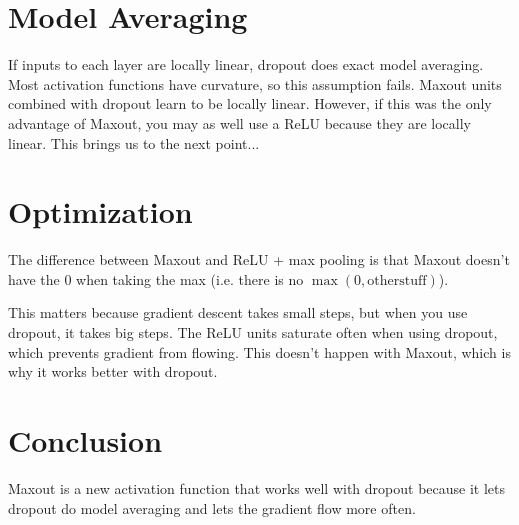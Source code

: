 \documentclass[a4paper]{article}
\begin{document}
\section{Model Averaging}
If inputs to each layer are locally linear, dropout does exact model averaging.
Most activation functions have curvature, so this assumption fails. Maxout
units combined with dropout learn to be locally linear. However, if this was
the only advantage of Maxout, you may as well use a ReLU because they are
locally linear. This brings us to the next point...

\section{Optimization}
The difference between Maxout and ReLU + max pooling is that Maxout doesn't have
the 0 when taking the max (i.e. there is no $\max(0, \mathrm{other stuff})$).

This matters because gradient descent takes small steps, but when you use
dropout, it takes big steps. The ReLU units saturate often when using dropout,
which prevents gradient from flowing. This doesn't happen with Maxout, which is
why it works better with dropout.

\section{Conclusion}
Maxout is a new activation function that works well with dropout because it lets
dropout do model averaging and lets the gradient flow more often.
\end{document}

